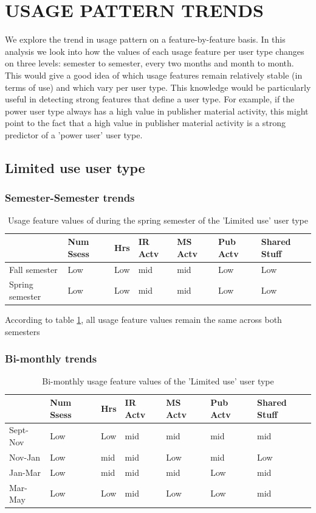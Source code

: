 \documentclass{acm_proc_article-sp}
\begin{document}
\section{USAGE PATTERN TRENDS}
We explore the trend in usage pattern on a feature-by-feature basis. In this analysis we look into how the values of each usage feature per user type changes on three levels: semester to semester, every two months and month to month. This would give a good idea of which usage features remain relatively stable (in terms of use) and which vary per user type. This knowledge would be particularly useful in detecting strong features that define a user type. For example, if the power user type always has a high value in  publisher material activity, this  might point to the fact that a high value in publisher material activity is a strong predictor of a 'power user' user type.
\subsection{Limited use user type}
\subsubsection{Semester-Semester trends}
\begin{table}
\caption{Usage feature values of during the spring semester of the 'Limited use' user type}
\label{cluster0month}
\begin{tabular}{|p{1.5cm}|p{0.6cm}|p{0.6cm}|p{0.6cm}|p{0.6cm}|p{0.8cm}|p{0.8cm}|}
 & Num Ssess & Hrs & IR Actv & MS Actv & Pub Actv & Shared Stuff \\ \hline
 Fall  semester & Low & Low  & mid & mid & Low & Low \\ \hline
Spring semester & Low & Low  & mid & mid & Low & Low \\ \hline
\end{tabular}
\end{table}
According to table \ref{cluster0month}, all usage feature values remain the same across both semesters
\subsubsection{Bi-monthly trends}
\begin{table}
\caption{Bi-monthly usage feature values of the 'Limited use' user type}
\label{cluster0bimonthly}
\begin{tabular}{|p{1.5cm}|p{0.6cm}|p{0.6cm}|p{0.6cm}|p{0.6cm}|p{0.8cm}|p{0.8cm}|}
 & Num Ssess & Hrs & IR Actv & MS Actv & Pub Actv & Shared Stuff \\ \hline
Sept-Nov & Low & Low  & mid & mid & mid & mid \\ \hline
Nov-Jan & Low & mid  & mid & Low & mid & Low \\ \hline
Jan-Mar & Low & mid  & mid & mid & Low & mid \\ \hline
Mar-May & Low & Low  & mid & Low & Low & mid \\ \hline
\end{tabular}
\end{table}
\end{document}
